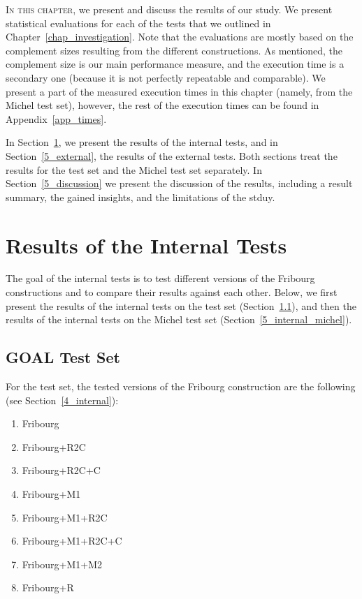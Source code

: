 \lettrine{I}{n this chapter}, we present and discuss the results of our study. We present statistical evaluations for each of the tests that we outlined in Chapter~\ref{chap_investigation}. Note that the evaluations are mostly based on the complement sizes resulting from the different constructions. As mentioned, the complement size is our main performance measure, and the execution time is a secondary one (because it is not perfectly repeatable and comparable). We present a part of the measured execution times in this chapter (namely, from the Michel test set), however, the rest of the execution times can be found in Appendix~\ref{app_times}.

In Section~\ref{5_internal}, we present the results of the internal tests, and in Section~\ref{5_external}, the results of the external tests. Both sections treat the results for the \goal{} test set and the Michel test set separately. In Section~\ref{5_discussion} we present the discussion of the results, including a result summary, the gained insights, and the limitations of the stduy.


\section{Results of the Internal Tests}
\label{5_internal}
The goal of the internal tests is to test different versions of the Fribourg constructions and to compare their results against each other. Below, we first present the results of the internal tests on the \goal{} test set (Section~\ref{5_internal_goal}), and then the results of the internal tests on the Michel test set (Section~\ref{5_internal_michel}).

\subsection{GOAL Test Set}
\label{5_internal_goal}
For the \goal{} test set, the tested versions of the Fribourg construction are the following (see Section~\ref{4_internal}):

\begin{enumerate}
\item Fribourg
\item Fribourg+R2C
\item Fribourg+R2C+C
\item Fribourg+M1
\item Fribourg+M1+R2C
\item Fribourg+M1+R2C+C
\item Fribourg+M1+M2
\item Fribourg+R
\end{enumerate}

